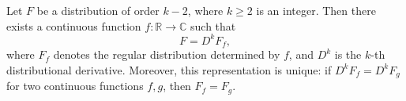 Let $F$ be a distribution of order $k-2$, where $k \geq 2$ is an integer. Then there exists a continuous function $f \colon \mathbb{R} \to \mathbb{C}$ such that
$$F = D^{k} F_{f},$$
where $F_{f}$ denotes the regular distribution determined by $f$, and $D^{k}$ is the $k$-th distributional derivative. Moreover, this representation is unique: if $D^{k}F_{f} = D^{k}F_{g}$ for two continuous functions $f, g$, then $F_{f} = F_{g}$.
